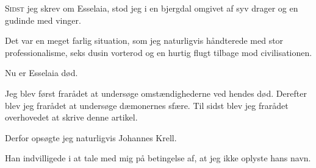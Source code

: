 \documentclass[a4paper,12pt]{memoir}
\begin{document}
\vspace{0.5em}

\lettrine[lines=2,lhang=0.1,loversize=0.05]{S}{idst}
jeg skrev om Esselaia, stod jeg i en bjergdal omgivet af syv
drager og en gudinde med vinger.

Det var en meget farlig situation, som jeg naturligvis
håndterede med stor professionalisme, seks dusin vorterod
og en hurtig flugt tilbage mod civilisationen.

Nu er Esselaia død.

Jeg blev først frarådet at undersøge omstændighederne ved hendes død. Derefter blev
jeg frarådet at undersøge dæmonernes sfære. Til sidst blev jeg
frarådet overhovedet at skrive denne artikel.

Derfor opsøgte jeg naturligvis Johannes Krell.

Han indvilligede i at tale med mig på betingelse af, at jeg
ikke oplyste hans navn. 
\end{document}
